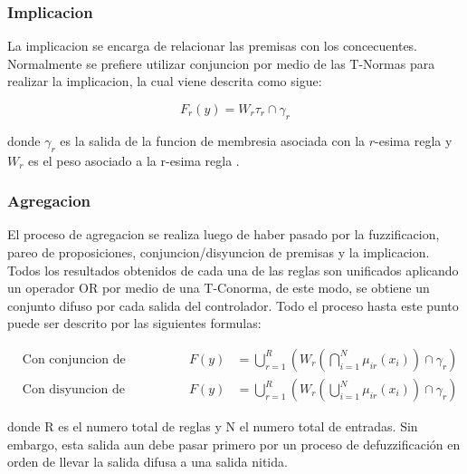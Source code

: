         \subsubsection{Implicacion}

            La implicacion se encarga de relacionar las premisas con los concecuentes. Normalmente se prefiere utilizar conjuncion por medio de las T-Normas para realizar la implicacion, la cual viene descrita como sigue:

            \begin{equation}\label{eq:implicacion}
                F_r(y) = W_r \tau_{r} \cap \gamma_r
            \end{equation}

            \noindent donde $\gamma_r$ es la salida de la funcion de membresia asociada con la $r$-esima regla y $W_r$ es el peso asociado a la r-esima regla \Parencite{riid2003transparent}.

        \subsubsection{Agregacion}

            El proceso de agregacion se realiza luego de haber pasado por la fuzzificacion, pareo de proposiciones, conjuncion/disyuncion de premisas y la implicacion. Todos los resultados obtenidos de cada una de las reglas son unificados aplicando un operador OR por medio de una T-Conorma, de este modo, se obtiene un conjunto difuso por cada salida del controlador. Todo el proceso hasta este punto puede ser descrito por las siguientes formulas:

            \vspace{10pt}
            \begin{align}
                &\text{Con conjuncion de premisas:} & F(y) &= \bigcup_{r=1}^{R}\left(W_r \left(\bigcap_{i=1}^{N}\mu_{ir}(x_i) \right) \cap \gamma_r\right) \label{eq:fconjuncion} \\
                &\text{Con disyuncion de premisas:} & F(y) &= \bigcup_{r=1}^{R}\left(W_r \left(\bigcup_{i=1}^{N}\mu_{ir}(x_i) \right) \cap \gamma_r\right) \label{eq:fdisyuncion}
            \end{align}
            \vspace{10pt}

            \noindent donde R es el numero total de reglas y N el numero total de entradas. Sin embargo, esta salida aun debe pasar primero por un proceso de defuzzificación en orden de llevar la salida difusa a una salida nitida.

